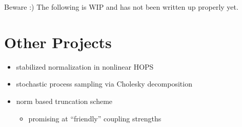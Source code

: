\documentclass[10pt, aspectratio=169]{beamer}
\begin{document}
\begin{frame}
  \begin{center}
    \begin{alertblock}{Beware :)}
      The following is WIP and has not been written up properly yet.
    \end{alertblock}
  \end{center}
\end{frame}


\section{Other Projects}
\begin{frame}[allowframebreaks]
  \begin{itemize}
  \item stabilized normalization in nonlinear HOPS
    \begin{figure}
      \centering
    \end{figure}
  \item stochastic process sampling via Cholesky decomposition
    \begin{figure}
      \centering
    \end{figure}
  \item norm based truncation scheme
    \begin{itemize}
    \item promising at ``friendly'' coupling strengths
    \end{itemize}
    \begin{figure}
      \centering
    \end{figure}
  \end{itemize}
\end{frame}
\end{document}
